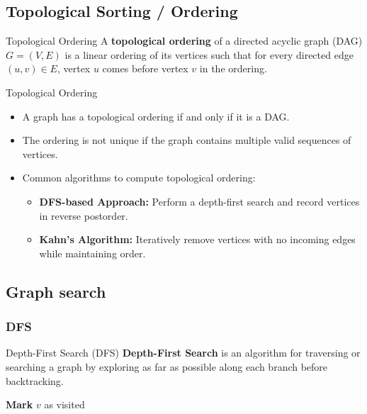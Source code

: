 \newpage
\subsection{Topological Sorting / Ordering}
\begin{definition}[]{Topological Ordering}
    A \textbf{topological ordering} of a directed acyclic graph (DAG) $G = (V, E)$ is a linear ordering of its vertices such that for every directed edge $(u, v) \in E$, vertex $u$ comes before vertex $v$ in the ordering.
\end{definition}

\begin{properties}[]{Topological Ordering}
    \begin{itemize}
        \item A graph has a topological ordering if and only if it is a DAG.
        \item The ordering is not unique if the graph contains multiple valid sequences of vertices.
        \item Common algorithms to compute topological ordering:
              \begin{itemize}
                  \item \textbf{DFS-based Approach:} Perform a depth-first search and record vertices in reverse postorder.
                  \item \textbf{Kahn’s Algorithm:} Iteratively remove vertices with no incoming edges while maintaining order.
              \end{itemize}
    \end{itemize}
\end{properties}




\newpage
\subsection{Graph search}
\subsubsection{DFS}
\begin{definition}[]{Depth-First Search (DFS)}
    \textbf{Depth-First Search} is an algorithm for traversing or searching a graph by exploring as far as possible along each branch before backtracking.
\end{definition}

\begin{algorithm}
    \caption{Depth-First Search (Recursive)}
    \begin{algorithmic}[1]
            \State \textbf{Mark} $v$ as visited
                    \State {}
                \EndIf
            \EndFor
        \EndProcedure
    \end{algorithmic}
\end{algorithm}

